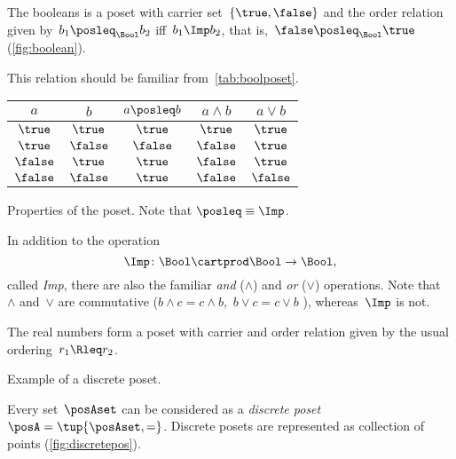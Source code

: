 \begin{example}[Booleans]
    \label{ex:bool}
    The booleans \index{\Bool} is a poset with carrier set~$\{\true,\false\}$ and the order relation given by~$b_1 \posleq_\Bool b_2$ iff~$b_1 \Imp b_2$, that is,~$\false \posleq_\Bool \true$ (\cref{fig:boolean}).

    This relation should be familiar from~\cref{tab:boolposet}.

    \begin{margintable}
        \centering
        \begin{tabular}{cc|ccc}
            $a$      & $b$      & $a \posleq  b$ & $a \wedge b$ & $a \vee b$ \\ \hline
            $\true$  & $\true$  & $\true$        & $\true$      & $\true$    \\
            $\true$  & $\false$ & $\false$       & $\false$     & $\true$    \\
            $\false$ & $\true$  & $\true$        & $\false$     & $\true$    \\
            $\false$ & $\false$ & $\true$        & $\false$     & $\false$
        \end{tabular}
        \caption{Properties of the \Bool poset.
            Note that $\posleq \equiv \Imp$.}
        \label{tab:boolposet}
    \end{margintable}

    In addition to the operation
    \begin{equation*}
        \Imp\colon\Bool\cartprod \Bool\to\Bool,
    \end{equation*}
    called \emph{Imp}, there are also the familiar \emph{and} ($\wedge$) and \emph{or} ($\vee$) operations.
    Note that~$\wedge$ and~$\vee$ are commutative ($b\wedge c = c\wedge b$,~$b\vee c = c\vee b$ ), whereas~$\Imp$ is not.
\end{example}

\begin{example}[Reals]
    The real numbers \reals form a poset with carrier \reals and order relation given by the usual ordering~$r_1 \Rleq r_2$.
\end{example}

\begin{marginfigure}
    \centering
    \caption{Example of a discrete poset.}
    \label{fig:discretepos}
\end{marginfigure}

\begin{example}
    \label{ex:discreteposet}
    Every set~$\posAset$ can be considered as a \emph{discrete poset}~$\posA = \tup{\posAset,=}$.
    Discrete posets are represented as collection of points (\cref{fig:discretepos}).
\end{example}

